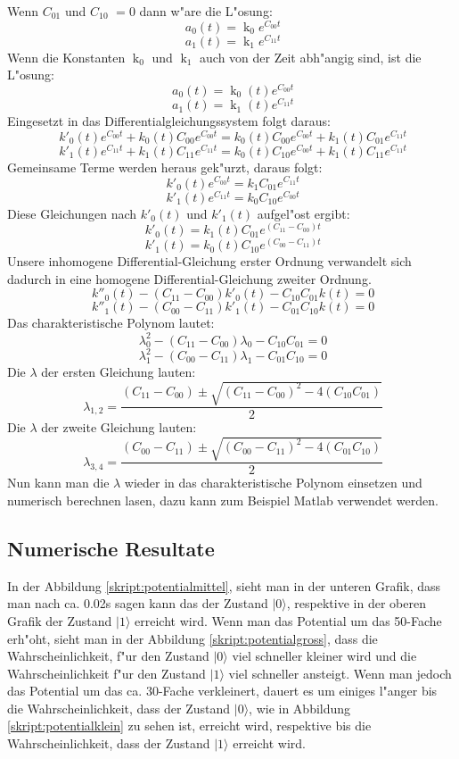 \begin{refsection}
Wenn $ C_{01}$ und $ C_{10}$ $ =0$ dann w"are die L"osung:
\[
\ a_{0}(t) = \operatorname{k}_0 e^{C_{00} t} 
\]
\[
\ a_{1}(t) = \operatorname{k}_1 e^{C_{11} t}
\]
Wenn die Konstanten $ \operatorname{k}_0 $ und $ \operatorname{k}_1 $
auch von der Zeit abh"angig sind, ist die L"osung: 
\[
\ a_{0}(t) = \operatorname{k}_0(t) e^{C_{00} t} 
\]
\[
\ a_{1}(t) = \operatorname{k}_1(t) e^{C_{11} t} 
\]
Eingesetzt in das Differentialgleichungssystem folgt daraus:
\[
\ k'_{0}(t) e^{C_{00} t} + k_{0}(t) C_{00} e^{C_{00} t} = k_{0}(t) C_{00} e^{C_{00} t} + k_{1}(t)C_{01}e^{C_{11} t}
\]
\[
\ k'_{1}(t) e^{C_{11} t} + k_{1}(t) C_{11} e^{C_{11} t} = k_{0}(t) C_{10} e^{C_{00} t} + k_{1}(t)C_{11}e^{C_{11} t}
\]
Gemeinsame Terme werden heraus gek"urzt, daraus folgt:
\[
\ k'_{0}(t) e^{C_{00} t} = k_{1} C_{01} e^{C_{11} t}
\]
\[
\ k'_{1}(t) e^{C_{11} t} = k_{0} C_{10} e^{C_{00} t}
\]
Diese Gleichungen nach $ k'_{0}(t)$ und $ k'_{1}(t)$ aufgel"ost ergibt:
\[
\ k'_{0}(t) = k_{1}(t) C_{01} e^{(C_{11}-C_{00}) t}
\]
\[
\ k'_{1}(t) = k_{0}(t) C_{10} e^{(C_{00}-C_{11}) t}
\]
Unsere inhomogene Differential-Gleichung erster Ordnung verwandelt
sich dadurch in eine homogene Differential-Gleichung zweiter Ordnung.
\[ 
\ k''_{0}(t) - (C_{11}-C_{00}) k'_{0}(t) - C_{10}C_{01}k(t) = 0
\]
\[
\ k''_{1}(t) - (C_{00}-C_{11}) k'_{1}(t) - C_{01}C_{10}k(t) = 0
\]
Das charakteristische Polynom lautet:
\[
\ \lambda_{0}^{2} - (C_{11}-C_{00})\lambda_{0} - C_{10}C_{01} = 0
\]
\[
\ \lambda_{1}^{2} - (C_{00}-C_{11})\lambda_{1} - C_{01}C_{10} = 0
\]
Die $ \lambda $ der ersten Gleichung lauten:
\[
\ \lambda_{1,2} = \frac{(C_{11}-C_{00})\pm \sqrt{(C_{11}-C_{00})^2-4(C_{10}C_{01})}}{2}
\]
Die $ \lambda $ der zweite Gleichung lauten:
\[
\ \lambda_{3,4} = \frac{(C_{00}-C_{11})\pm \sqrt{(C_{00}-C_{11})^2-4(C_{01}C_{10})}}{2}
\]
Nun kann man die $\lambda$ wieder in das charakteristische Polynom
einsetzen und numerisch berechnen lasen, dazu kann zum Beispiel Matlab
verwendet werden.

\subsection{Numerische Resultate}
In der Abbildung \ref{skript:potentialmittel}, sieht man in der unteren
Grafik, dass man nach ca. 0.02s sagen kann das der Zustand $|0\rangle$, 
respektive in der oberen Grafik der Zustand $|1\rangle$ erreicht wird.
Wenn man das Potential um das 50-Fache erh"oht, sieht man in der Abbildung
\ref{skript:potentialgross}, dass die Wahrscheinlichkeit, f"ur  den Zustand
$|0\rangle$ viel schneller kleiner wird und die Wahrscheinlichkeit f"ur den
Zustand $|1\rangle$ viel schneller ansteigt.
Wenn man jedoch das Potential um das ca. 30-Fache verkleinert, dauert es
um einiges l"anger bis die Wahrscheinlichkeit, dass der Zustand $|0\rangle$,
wie in Abbildung \ref{skript:potentialklein} zu sehen ist, erreicht wird,
respektive bis die Wahrscheinlichkeit, dass der Zustand $|1\rangle$ erreicht
wird.


\end{refsection}
